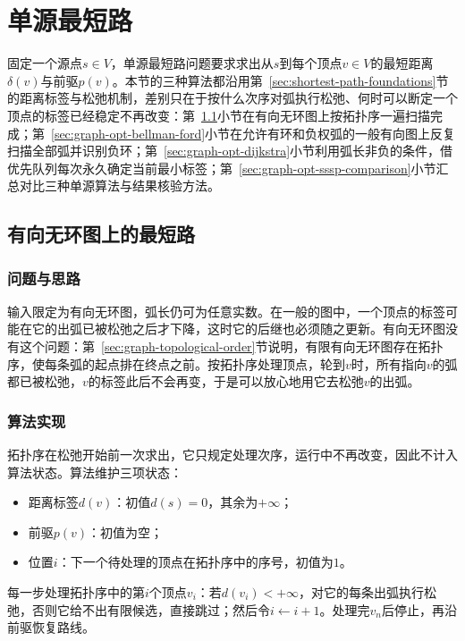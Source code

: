 
\section{单源最短路}
\label{sec:single-source-shortest-paths}

固定一个源点$s\in V$，单源最短路问题要求求出从$s$到每个顶点$v\in V$的最短距离$\delta(v)$与前驱$p(v)$。本节的三种算法都沿用第~\ref{sec:shortest-path-foundations}节的距离标签与松弛机制，差别只在于按什么次序对弧执行松弛、何时可以断定一个顶点的标签已经稳定不再改变：第~\ref{sec:graph-opt-dag-sp}小节在有向无环图上按拓扑序一遍扫描完成；第~\ref{sec:graph-opt-bellman-ford}小节在允许有环和负权弧的一般有向图上反复扫描全部弧并识别负环；第~\ref{sec:graph-opt-dijkstra}小节利用弧长非负的条件，借优先队列每次永久确定当前最小标签；第~\ref{sec:graph-opt-sssp-comparison}小节汇总对比三种单源算法与结果核验方法。

\subsection{有向无环图上的最短路}
\label{sec:graph-opt-dag-sp}
\label{sec:graph-opt-dag-shortest-path}

\subsubsection{问题与思路}

输入限定为有向无环图，弧长仍可为任意实数。在一般的图中，一个顶点的标签可能在它的出弧已被松弛之后才下降，这时它的后继也必须随之更新。有向无环图没有这个问题：第~\ref{sec:graph-topological-order}节说明，有限有向无环图存在拓扑序，使每条弧的起点排在终点之前。按拓扑序处理顶点，轮到$v$时，所有指向$v$的弧都已被松弛，$v$的标签此后不会再变，于是可以放心地用它去松弛$v$的出弧。

\subsubsection{算法实现}

拓扑序在松弛开始前一次求出，它只规定处理次序，运行中不再改变，因此不计入算法状态。算法维护三项状态：
\begin{itemize}
  \item 距离标签$d(v)$：初值$d(s)=0$，其余为$+\infty$；
  \item 前驱$p(v)$：初值为空；
  \item 位置$i$：下一个待处理的顶点在拓扑序中的序号，初值为$1$。
\end{itemize}
每一步处理拓扑序中的第$i$个顶点$v_i$：若$d(v_i)<+\infty$，对它的每条出弧执行松弛，否则它给不出有限候选，直接跳过；然后令$i\gets i+1$。处理完$v_n$后停止，再沿前驱恢复路线。

